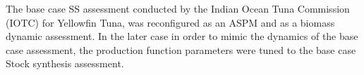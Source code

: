 The base case SS assessment conducted by the Indian Ocean Tuna Commission (IOTC) for Yellowfin Tuna, was reconfigured as an ASPM and as a biomass dynamic assessment. In the later case in order to mimic the dynamics of the base case assessment, the production function parameters were tuned to the base case Stock synthesis assessment. 
